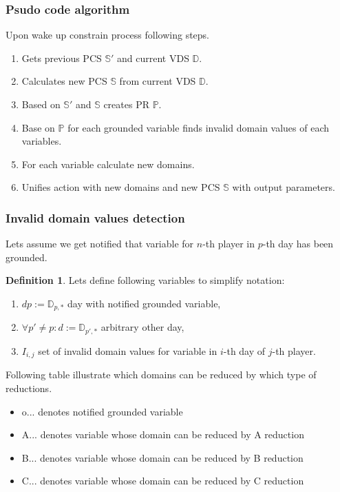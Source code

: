 \documentclass[a4paper]{article}
\theoremstyle{definition}
\newtheorem{definition}{Definition}[section]
\theoremstyle{remark}
\newcommand{\mdef}[2]{
	\theoremstyle{definition}
	\begin{definition}{#1}
	#2
	\end{definition}
}
\begin{document}
\subsubsection{Psudo code algorithm}
Upon wake up constrain process following steps.

\begin{enumerate}
\item Gets previous PCS $\mathbb{S'}$ and current VDS $\mathbb{D}$.
\item Calculates new PCS $\mathbb{S}$ from current VDS $\mathbb{D}$.
\item Based on $\mathbb{S'}$ and $\mathbb{S}$ creates PR $\mathbb{P}$.
\item Base on $\mathbb{P}$ for each grounded variable finds invalid domain values of each variables.
\item For each variable calculate new domains.
\item Unifies action with new domains and new PCS $\mathbb{S}$ with output parameters.
\end{enumerate}

\subsubsection{Invalid domain values detection}
Lets assume we get notified that variable for $n$-th player in $p$-th day has been grounded. 
\mdef{}{Lets define following variables to simplify notation: 
\begin{enumerate}
\item $dp := \mathbb{D}_{p,*}$ \hfill day with notified grounded variable,
\item $\forall p' \neq p: d := \mathbb{D}_{p',*}$ \hfill arbitrary other day,
\item $I_{i,j}$ \hfill set of invalid domain values for variable in $i$-th day of $j$-th player.
\end{enumerate}
}

Following table illustrate which domains can be reduced by which type of reductions.
\begin{itemize}
\item o... denotes notified grounded variable
\item A... denotes variable whose domain can be reduced by A reduction
\item B... denotes variable whose domain can be reduced by B reduction
\item C... denotes variable whose domain can be reduced by C reduction
\end{itemize}
 
\end{document}
